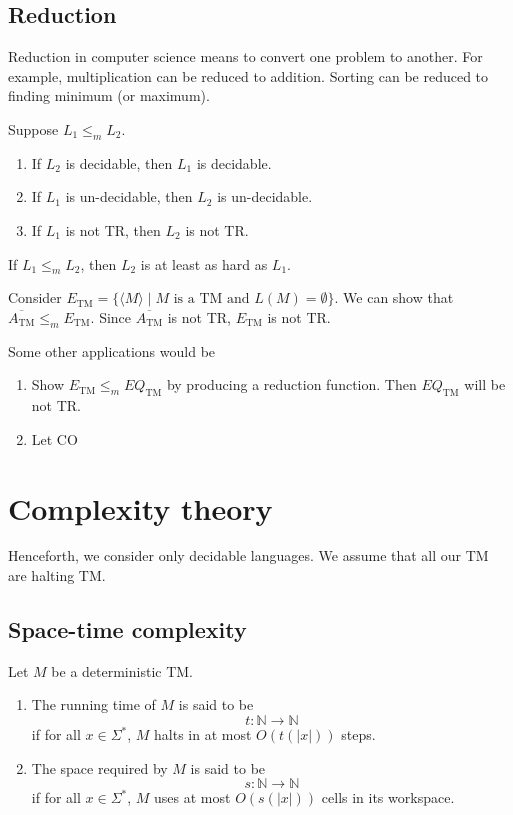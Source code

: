 \documentclass{article}
\begin{document}
\subsection{Reduction}

Reduction in computer science means to convert one problem to another. For example, multiplication can be reduced to addition. Sorting can be reduced to finding minimum (or maximum).

Suppose $L_1 \leq_m L_2$. 
\begin{enumerate}
\item\label{item:69} If $L_2$ is decidable, then $L_1$ is decidable. 
\item\label{item:70} If $L_1$ is un-decidable, then $L_2$ is un-decidable. 
\item\label{item:71} If $L_1$ is not TR, then $L_2$ is not TR.
\end{enumerate}

If  $L_1 \leq_m L_2$, then $L_2$ is at least as hard as $L_1$.

Consider $E_{\text{TM}} = \{ \langle M \rangle \mid M \text{ is a TM and } L(M) = \emptyset \}$. We can show that $\overline{A_{\text{TM}}} \leq_m E_{\text{TM}}$. Since $\overline{A_{\text{TM}}}$ is not TR, $E_{\text{TM}}$ is not TR.

Some other applications would be 
\begin{enumerate}
\item\label{item:72} Show $E_{\text{TM}} \leq_m EQ_{\text{TM}}$ by producing a reduction function. Then $EQ_{\text{TM}}$ will be not TR. 
\item\label{item:73} Let CO
\end{enumerate}

\section{Complexity theory}

Henceforth, we consider only decidable languages. We assume that all our TM are halting TM.

\subsection{Space-time complexity}

Let $M$ be a deterministic TM. 
\begin{enumerate}
\item\label{item:56} The running time of $M$ is said to be 
\begin{displaymath}
t: \mathbb{N} \to \mathbb{N}
\end{displaymath}
if for all $x \in \Sigma^{*}$, $M$ halts in at most $O(t(|x|))$ steps. 
\item\label{item:57} The space required by $M$ is said to be 
\begin{displaymath}
s: \mathbb{N} \to \mathbb{N}
\end{displaymath}
if for all $x\in \Sigma^{*}$, $M$ uses at most $O(s(|x|))$ cells in its workspace.
\end{enumerate}
\end{document}

